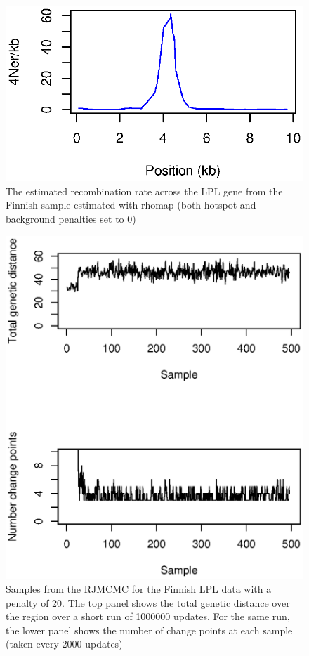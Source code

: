 \documentclass[a4paper,10pt,fullpage]{article}
\begin{document}
\begin{figure}
\linespread{1.3} \centering
\includegraphics[scale=1.0]{lpl_rhomap.eps}
\caption{The estimated recombination rate across the LPL gene from the Finnish sample estimated with rhomap (both hotspot and background penalties set to 0)}
\label{fig:lpl_rhomap}
\end{figure}

\begin{figure}
\linespread{1.3} \centering
\includegraphics[scale=1.0]{LPLsamples.eps}
\caption{Samples from the RJMCMC for the Finnish LPL data with a
penalty of 20. The top panel shows the total genetic distance over
the region over a short run of 1000000 updates.  For the same run,
the lower panel shows the number of change points at each sample
(taken every 2000 updates)} \label{fig:lpl_samples}
\end{figure}
\end{document}
